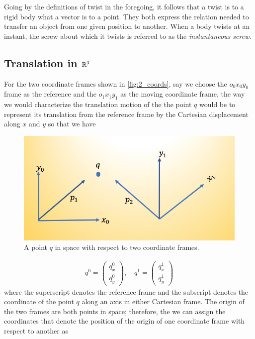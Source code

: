 Going by the definitions of twist in the foregoing, it follows that a twist is to a rigid body what a vector is to a point. They both express the relation needed to transfer an object from one given position to another. When a body twists at an instant, the screw about which it twists is referred to as the \textit{instantaneous screw}.

\subsection{Translation in $\mathbb{R}^3$}

%
For the two coordinate frames shown in  \autoref{fig:2_coords}, say we choose the $o_0x_0 y_0$ frame as the reference and the $o_1x_1y_1$ as the moving coordinate frame, the way we would characterize the translation motion of the the point $q$ would be to represent its translation from the reference frame by the Cartesian displacement along $x$ and $y$ so that we have 
\begin{figure}
	\centering
	\includegraphics[width=.8\columnwidth]{figures/trans_coords.jpg}
	\caption{A point $q$ in space with respect to two coordinate frames.}
	\label{fig:2_coords}
\end{figure}
%
\begin{align}
q^0 = \left( \begin{array}{c}
q^0_x \\ q_y^0
\end{array}
\right), \quad
%
q^1 = \left( \begin{array}{c}
q^1_x \\ q_y^1
\end{array}
\right)
\end{align}
%
where the superscript denotes the reference frame and the subscript denotes the coordinate of the point $q$ along an axis in either Cartesian frame. The origin of the two frames are both points in space; therefore, the we can assign the coordinates that denote the position of the origin of one coordinate frame with respect to another as 
